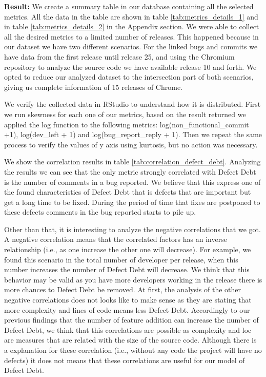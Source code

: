 \vspace{1mm}
\noindent\textbf{Result:} We create a summary table in our database containing all the selected metrics. All the data in the table are shown in table \ref{tab:metrics_details_1} and in table \ref{tab:metrics_details_2} in the Appendix section. We were able to collect all the desired metrics to a limited number of releases. This happened because in our dataset we have two different scenarios. For the linked bugs and commits we have data from the first release until release 25, and using the Chromium repository to analyze the source code we have available release 10 and forth. We opted to reduce our analyzed dataset to the intersection part of both scenarios,  giving us complete information of 15 releases of Chrome.

We verify the collected data in RStudio to understand how it is distributed. First we run skewness for each one of our metrics, based on the result returned we applied the log function to the following metrics:  log(non\_functional\_commit +1), log(dev\_left + 1) and  log(bug\_report\_reply + 1). Then we repeat the same process to verify the values of y axis using kurtosis, but no action was necessary. 

We show the correlation results in table \ref{tab:correlation_defect_debt}.  Analyzing the results we can see that the only metric strongly correlated with Defect Debt is the number of comments in a bug reported. We believe that this express one of the found characteristics of Defect Debt that is defects that are important but get a long time to be fixed. During the period of time that fixes are postponed to these defects comments in the bug reported starts to pile up. 

Other than that, it is interesting to analyze the negative correlations that we got. A negative correlation means that the correlated factors has an inverse relationship (i.e., as one increase the other one will decrease). For example, we found this scenario in the total number of developer per release, when this number increases the number of Defect Debt will decrease. We think that this behavior may be valid as you have more developers working in the release there is more chances to Defect Debt be removed. At first, the analysis of the other negative correlations does not looks like to make sense as they are stating that more complexity and lines of code means less Defect Debt. Accordingly to our previous findings that the number of feature addition can increase the number of Defect Debt, we think that this correlations are possible as complexity and loc are measures that are related with the size of the source code. Although there is a explanation for these correlation (i.e., without any code the project will have no defects) it does not means that these correlations are useful for our model of Defect Debt. 


